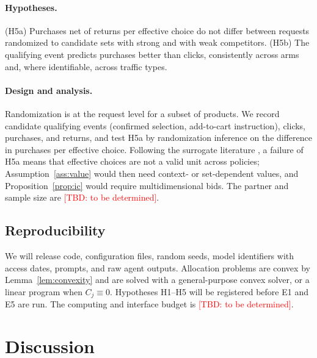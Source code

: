 \documentclass[opre,dblanonrev]{informs4}
\providecommand{\1}{\mathbf{1}}
\providecommand{\TBD}[1]{\textcolor{red}{[TBD: #1]}}
\begin{document}
\paragraph{Hypotheses.} (H5a) Purchases net of returns per effective choice do not differ between requests randomized to candidate sets with strong and with weak competitors. (H5b) The qualifying event predicts purchases better than clicks, consistently across arms and, where identifiable, across traffic types.

\paragraph{Design and analysis.} Randomization is at the request level for a subset of products. We record candidate qualifying events (confirmed selection, add-to-cart instruction), clicks, purchases, and returns, and test H5a by randomization inference on the difference in purchases per effective choice. Following the surrogate literature \citep{prentice1989surrogate,athey2026surrogate}, a failure of H5a means that effective choices are not a valid unit across policies; Assumption~\ref{ass:value} would then need context- or set-dependent values, and Proposition~\ref{prop:ic} would require multidimensional bids. The partner and sample size are \TBD{to be determined}.

\subsection{Reproducibility}\label{sec:exp-repro}

We will release code, configuration files, random seeds, model identifiers with access dates, prompts, and raw agent outputs. Allocation problems are convex by Lemma~\ref{lem:convexity} and are solved with a general-purpose convex solver, or a linear program when $C_j\equiv0$. Hypotheses H1--H5 will be registered before E1 and E5 are run. The computing and interface budget is \TBD{to be determined}.

\section{Discussion}\label{sec:discussion}
\end{document}
